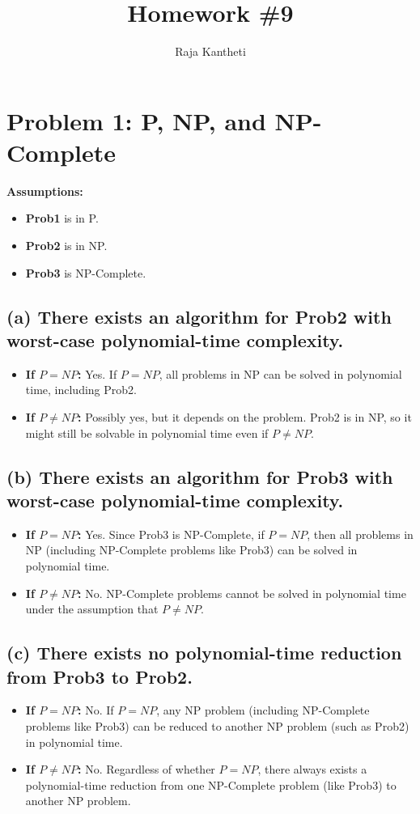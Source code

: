 \documentclass[12pt]{article}
\title{Homework \#9}
\author{Raja Kantheti}
\date{}
\begin{document}
\maketitle

\section*{Problem 1: P, NP, and NP-Complete}
\textbf{Assumptions:}
\begin{itemize}
    \item \textbf{Prob1} is in P.
    \item \textbf{Prob2} is in NP.
    \item \textbf{Prob3} is NP-Complete.
\end{itemize}

\subsection*{(a) There exists an algorithm for Prob2 with worst-case polynomial-time complexity.}
\begin{itemize}
    \item \textbf{If \(P = NP\):} Yes. If \(P = NP\), all problems in NP can be solved in polynomial time, including Prob2.
    \item \textbf{If \(P \neq NP\):} Possibly yes, but it depends on the problem. Prob2 is in NP, so it might still be solvable in polynomial time even if \(P \neq NP\).
\end{itemize}

\subsection*{(b) There exists an algorithm for Prob3 with worst-case polynomial-time complexity.}
\begin{itemize}
    \item \textbf{If \(P = NP\):} Yes. Since Prob3 is NP-Complete, if \(P = NP\), then all problems in NP (including NP-Complete problems like Prob3) can be solved in polynomial time.
    \item \textbf{If \(P \neq NP\):} No. NP-Complete problems cannot be solved in polynomial time under the assumption that \(P \neq NP\).
\end{itemize}

\subsection*{(c) There exists no polynomial-time reduction from Prob3 to Prob2.}
\begin{itemize}
    \item \textbf{If \(P = NP\):} No. If \(P = NP\), any NP problem (including NP-Complete problems like Prob3) can be reduced to another NP problem (such as Prob2) in polynomial time.
    \item \textbf{If \(P \neq NP\):} No. Regardless of whether \(P = NP\), there always exists a polynomial-time reduction from one NP-Complete problem (like Prob3) to another NP problem.
\end{itemize}
\end{document}
